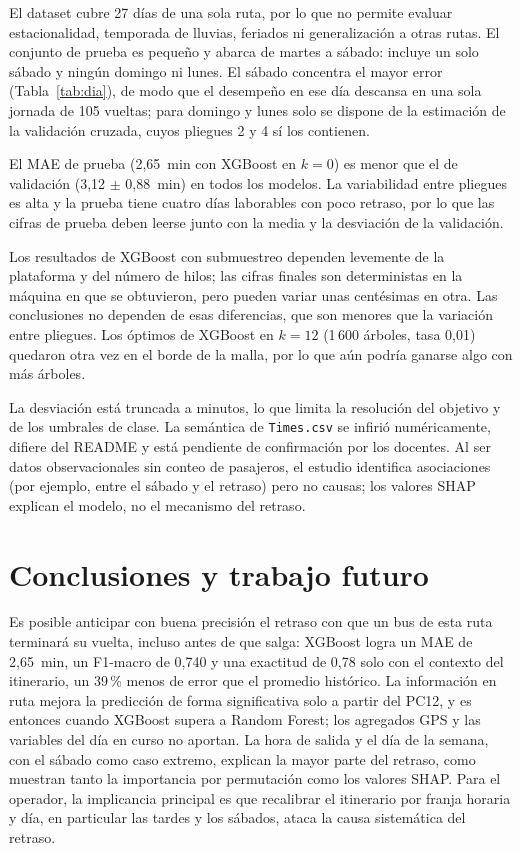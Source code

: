 \documentclass[conference]{IEEEtran}
\begin{document}
El dataset cubre 27 días de una sola ruta, por lo que no permite evaluar estacionalidad, temporada de lluvias, feriados ni generalización a otras rutas. El conjunto de prueba es pequeño y abarca de martes a sábado: incluye un solo sábado y ningún domingo ni lunes. El sábado concentra el mayor error (Tabla~\ref{tab:dia}), de modo que el desempeño en ese día descansa en una sola jornada de 105 vueltas; para domingo y lunes solo se dispone de la estimación de la validación cruzada, cuyos pliegues 2 y 4 sí los contienen.

El MAE de prueba (2,65~min con XGBoost en $k = 0$) es menor que el de validación (3,12 $\pm$ 0,88~min) en todos los modelos. La variabilidad entre pliegues es alta y la prueba tiene cuatro días laborables con poco retraso, por lo que las cifras de prueba deben leerse junto con la media y la desviación de la validación.

Los resultados de XGBoost con submuestreo dependen levemente de la plataforma y del número de hilos; las cifras finales son deterministas en la máquina en que se obtuvieron, pero pueden variar unas centésimas en otra. Las conclusiones no dependen de esas diferencias, que son menores que la variación entre pliegues. Los óptimos de XGBoost en $k = 12$ (1\,600 árboles, tasa 0,01) quedaron otra vez en el borde de la malla, por lo que aún podría ganarse algo con más árboles.

La desviación está truncada a minutos, lo que limita la resolución del objetivo y de los umbrales de clase. La semántica de \texttt{Times.csv} se infirió numéricamente, difiere del README y está pendiente de confirmación por los docentes. Al ser datos observacionales sin conteo de pasajeros, el estudio identifica asociaciones (por ejemplo, entre el sábado y el retraso) pero no causas; los valores SHAP explican el modelo, no el mecanismo del retraso.

\section{Conclusiones y trabajo futuro}\label{sec:conc}

Es posible anticipar con buena precisión el retraso con que un bus de esta ruta terminará su vuelta, incluso antes de que salga: XGBoost logra un MAE de 2,65~min, un F1-macro de 0,740 y una exactitud de 0,78 solo con el contexto del itinerario, un 39\,\% menos de error que el promedio histórico. La información en ruta mejora la predicción de forma significativa solo a partir del PC12, y es entonces cuando XGBoost supera a Random Forest; los agregados GPS y las variables del día en curso no aportan. La hora de salida y el día de la semana, con el sábado como caso extremo, explican la mayor parte del retraso, como muestran tanto la importancia por permutación como los valores SHAP. Para el operador, la implicancia principal es que recalibrar el itinerario por franja horaria y día, en particular las tardes y los sábados, ataca la causa sistemática del retraso.
\end{document}
